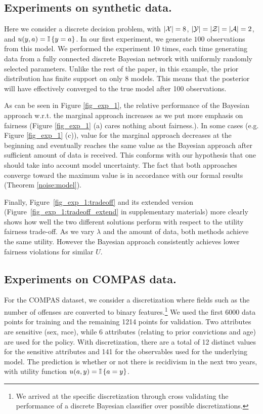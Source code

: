 \subsection{Experiments on synthetic data.}
Here we consider a discrete decision problem, with $|\mathcal{X}| = 8$,
$|\mathcal{Y}| = |\mathcal{Z}| = |\mathcal{A}| = 2$, and $u(y, a) = \mathop{\mbox{\ensuremath{\mathbb{I}}}}\left\{y = a\right\}$.  In our
first experiment, we generate $100$ observations from this model. We
performed the experiment 10 times, each time generating data from a
fully connected discrete Bayesian network with uniformly randomly
selected parameters. Unlike the rest of the paper, in this example,
the prior distribution has finite support on only 8 models. This means that the posterior will have effectively converged to the true model after 100 observations.



As can be seen in Figure \ref{fig_exp_1}, the relative performance of
the Bayesian approach w.r.t. the marginal approach increases as we put
more emphasis on fairness (Figure \ref{fig_exp_1}
(a) cares nothing about fairness.). In some cases (e.g. Figure \ref{fig_exp_1}
(c)), value for the marginal approach decreases at the beginning and
eventually reaches the same value as the Bayesian approach after
sufficient amount of data is received.  This conforms with our
hypothesis that one should take into account model uncertainty.  The
fact that both approaches converge toward the maximum value is in
accordance with our formal results (Theorem \ref{noise:model}).
     

Finally, Figure~\ref{fig_exp_1:tradeoff} and its extended version (Figure~\ref{fig_exp_1:tradeoff_extend} in supplementary materials) more clearly shows how well the two different solutions perform with respect to the utility fairness trade-off. As we vary $\lambda$ and the amount of data, both methods achieve the same utility. However the Bayesian approach consistently achieves lower fairness violations for similar $U$.


\subsection{Experiments on COMPAS data.}
For the COMPAS dataset, we consider a discretization where fields such as the number of offenses are converted to binary features.\footnote{We arrived at the specific discretization through cross validating the performance of a discrete Bayesian classifier over possible discretizations.} 
We used the first 6000 data points for training and the remaining 1214 points for validation. Two attributes are sensitive (sex, race), while 6 attributes (relating to prior convictions and age) are used for the policy.
With discretization, there are a total of 12 distinct values for the sensitive attributes and 141 for the observables used for the underlying model. The prediction is whether or not there is recidivism in the next two years, with utility function $u(a, y) = \mathop{\mbox{\ensuremath{\mathbb{I}}}}\left\{a = y\right\}$.

